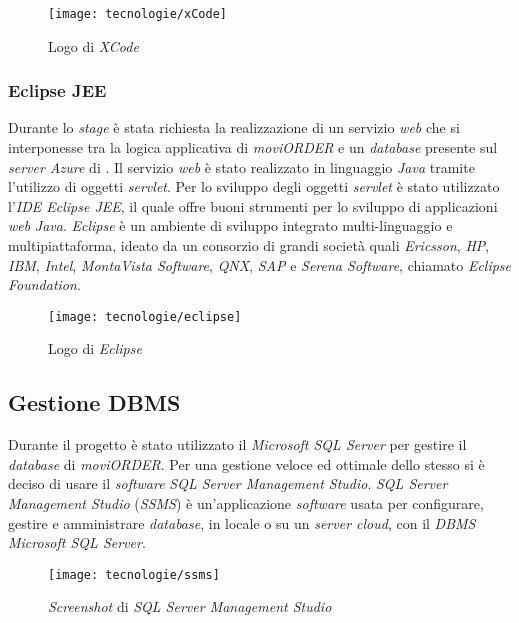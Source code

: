 \begin{figure}[!h] 
    \centering 
    \texttt{[image: tecnologie/xCode]} 
    \caption{Logo di \textit{XCode}}
\end{figure}

\subsubsection{Eclipse JEE}

Durante lo \textit{stage} è stata richiesta la realizzazione di un servizio \textit{web} che si interponesse tra la logica applicativa di \textit{moviORDER} e un \textit{database} presente sul \textit{server Azure} di \visione{}. Il servizio \textit{web} è stato realizzato in linguaggio \textit{Java} tramite l'utilizzo di oggetti \textit{servlet}. Per lo sviluppo degli oggetti \textit{servlet} è stato utilizzato l'\textit{IDE Eclipse JEE}, il quale offre buoni strumenti per lo sviluppo di applicazioni \textit{web} \textit{Java}. \textit{Eclipse} è un ambiente di sviluppo integrato multi-linguaggio e multipiattaforma, ideato da un consorzio di grandi società quali \textit{Ericsson}, \textit{HP}, \textit{IBM}, \textit{Intel}, \textit{MontaVista Software}, \textit{QNX}, \textit{SAP} e \textit{Serena Software}, chiamato \textit{Eclipse Foundation}.

\begin{figure}[!h] 
    \centering 
    \texttt{[image: tecnologie/eclipse]} 
    \caption{Logo di \textit{Eclipse}}
\end{figure}

\newpage

\subsection{Gestione DBMS}

Durante il progetto è stato utilizzato il  \textit{Microsoft SQL Server} per gestire il \textit{database} di \textit{moviORDER}. Per una gestione veloce ed ottimale dello stesso si è deciso di usare il \textit{software} \textit{SQL Server Management Studio}. \textit{SQL Server Management Studio} (\textit{SSMS}) è un'applicazione \textit{software} usata per configurare, gestire e amministrare \textit{database}, in locale o su un \textit{server cloud}, con il \textit{DBMS Microsoft SQL Server}. 

\begin{figure}[!h] 
    \centering 
    \texttt{[image: tecnologie/ssms]} 
    \caption{\textit{Screenshot} di \textit{SQL Server Management Studio}}
\end{figure}


